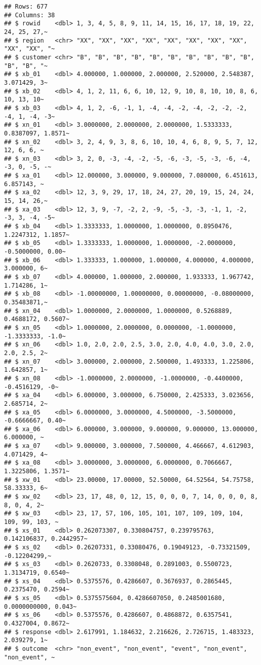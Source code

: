 \documentclass[
]{article}
\begin{document}
\begin{verbatim}
## Rows: 677
## Columns: 38
## $ rowid    <dbl> 1, 3, 4, 5, 8, 9, 11, 14, 15, 16, 17, 18, 19, 22, 24, 25, 27,~
## $ region   <chr> "XX", "XX", "XX", "XX", "XX", "XX", "XX", "XX", "XX", "XX", "~
## $ customer <chr> "B", "B", "B", "B", "B", "B", "B", "B", "B", "B", "B", "B", "~
## $ xb_01    <dbl> 4.000000, 1.000000, 2.000000, 2.520000, 2.548387, 3.071429, 3~
## $ xb_02    <dbl> 4, 1, 2, 11, 6, 6, 10, 12, 9, 10, 8, 10, 10, 8, 6, 10, 13, 10~
## $ xb_03    <dbl> 4, 1, 2, -6, -1, 1, -4, -4, -2, -4, -2, -2, -2, -4, 1, -4, -3~
## $ xn_01    <dbl> 3.0000000, 2.0000000, 2.0000000, 1.5333333, 0.8387097, 1.8571~
## $ xn_02    <dbl> 3, 2, 4, 9, 3, 8, 6, 10, 10, 4, 6, 8, 9, 5, 7, 12, 12, 6, 6, ~
## $ xn_03    <dbl> 3, 2, 0, -3, -4, -2, -5, -6, -3, -5, -3, -6, -4, -3, 0, -5, -~
## $ xa_01    <dbl> 12.000000, 3.000000, 9.000000, 7.080000, 6.451613, 6.857143, ~
## $ xa_02    <dbl> 12, 3, 9, 29, 17, 18, 24, 27, 20, 19, 15, 24, 24, 15, 14, 26,~
## $ xa_03    <dbl> 12, 3, 9, -7, -2, 2, -9, -5, -3, -3, -1, 1, -2, -3, 3, -4, -5~
## $ xb_04    <dbl> 1.3333333, 1.0000000, 1.0000000, 0.8950476, 1.2247312, 1.1857~
## $ xb_05    <dbl> 1.3333333, 1.0000000, 1.0000000, -2.0000000, -0.5000000, 0.00~
## $ xb_06    <dbl> 1.333333, 1.000000, 1.000000, 4.000000, 4.000000, 3.000000, 6~
## $ xb_07    <dbl> 4.000000, 1.000000, 2.000000, 1.933333, 1.967742, 1.714286, 1~
## $ xb_08    <dbl> -1.00000000, 1.00000000, 0.00000000, -0.08000000, 0.35483871,~
## $ xn_04    <dbl> 1.0000000, 2.0000000, 1.0000000, 0.5268889, 0.4688172, 0.5607~
## $ xn_05    <dbl> 1.0000000, 2.0000000, 0.0000000, -1.0000000, -1.3333333, -1.0~
## $ xn_06    <dbl> 1.0, 2.0, 2.0, 2.5, 3.0, 2.0, 4.0, 4.0, 3.0, 2.0, 2.0, 2.5, 2~
## $ xn_07    <dbl> 3.000000, 2.000000, 2.500000, 1.493333, 1.225806, 1.642857, 1~
## $ xn_08    <dbl> -1.0000000, 2.0000000, -1.0000000, -0.4400000, -0.4516129, -0~
## $ xa_04    <dbl> 6.000000, 3.000000, 6.750000, 2.425333, 3.023656, 2.685714, 2~
## $ xa_05    <dbl> 6.0000000, 3.0000000, 4.5000000, -3.5000000, -0.6666667, 0.40~
## $ xa_06    <dbl> 6.000000, 3.000000, 9.000000, 9.000000, 13.000000, 6.000000, ~
## $ xa_07    <dbl> 9.000000, 3.000000, 7.500000, 4.466667, 4.612903, 4.071429, 4~
## $ xa_08    <dbl> 3.0000000, 3.0000000, 6.0000000, 0.7066667, 1.3225806, 1.3571~
## $ xw_01    <dbl> 23.00000, 17.00000, 52.50000, 64.52564, 54.75758, 58.33333, 6~
## $ xw_02    <dbl> 23, 17, 48, 0, 12, 15, 0, 0, 0, 7, 14, 0, 0, 0, 8, 8, 0, 4, 2~
## $ xw_03    <dbl> 23, 17, 57, 106, 105, 101, 107, 109, 109, 104, 109, 99, 103, ~
## $ xs_01    <dbl> 0.262073307, 0.330804757, 0.239795763, 0.142106837, 0.2442957~
## $ xs_02    <dbl> 0.26207331, 0.33080476, 0.19049123, -0.73321509, -0.12204299,~
## $ xs_03    <dbl> 0.2620733, 0.3308048, 0.2891003, 0.5500723, 1.3134719, 0.6540~
## $ xs_04    <dbl> 0.5375576, 0.4286607, 0.3676937, 0.2865445, 0.2375470, 0.2594~
## $ xs_05    <dbl> 0.5375575604, 0.4286607050, 0.2485001680, 0.0000000000, 0.043~
## $ xs_06    <dbl> 0.5375576, 0.4286607, 0.4868872, 0.6357541, 0.4327004, 0.8672~
## $ response <dbl> 2.617991, 1.184632, 2.216626, 2.726715, 1.483323, 2.039279, 1~
## $ outcome  <chr> "non_event", "non_event", "event", "non_event", "non_event", ~
\end{verbatim}
\end{document}
